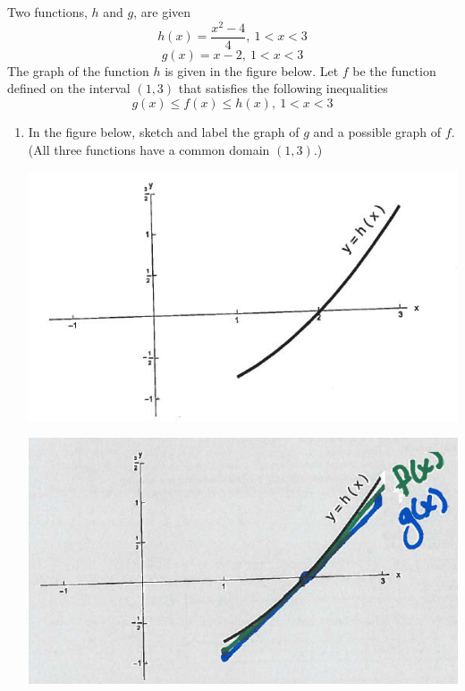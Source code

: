 \documentclass[nooutcomes]{ximera}
\begin{document}
\begin{problem}
	Two functions, $h$ and $g$, are given
	\[
	h(x)=\frac{x^2-4}{4},\  1 <x < 3
	\]
	\[
	g(x)=x-2,\  1 < x < 3
	\]
The graph of the function $h$ is given in the figure below.  
Let $f$ be the function defined on the interval $(1,3)$ that satisfies the following inequalities
	\[
	g(x) \le f(x) \le h(x),\ 1 < x < 3
	\]

	\begin{enumerate}
	
	\item In the figure below, sketch and label the graph of $g$ and a possible graph of $f$.  (All three functions have a common domain $(1,3)$.)

	\begin{image}
	\includegraphics{Figure1}
	\end{image}
	
	\begin{freeResponse}	
	\begin{image}
	\includegraphics{Figure2}
	\end{image}
	\end{freeResponse}


\end{enumerate}
\end{problem}
\end{document}
